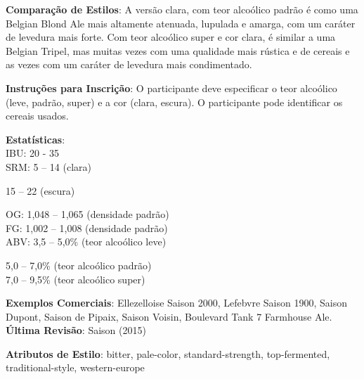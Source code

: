 \textbf{Comparação de Estilos}: A versão clara, com teor alcoólico padrão é como uma Belgian Blond Ale mais altamente atenuada, lupulada e amarga, com um caráter de levedura mais forte. Com teor alcoólico super e cor clara, é similar a uma Belgian Tripel, mas muitas vezes com uma qualidade mais rústica e de cereais e as vezes com um caráter de levedura mais condimentado.

\textbf{Instruções para Inscrição}: O participante deve especificar o teor alcoólico (leve, padrão, super) e a cor (clara, escura). O participante pode identificar os cereais usados.

\textbf{Estatísticas}:\\
IBU: 20 - 35\\
SRM: 5 – 14 (clara)
\begin{adjustwidth}{25pt}{0pt}
15 – 22 (escura)
\end{adjustwidth}
OG: 1,048 – 1,065 (densidade padrão)\\
FG: 1,002 – 1,008 (densidade padrão)\\
ABV: 3,5 – 5,0\% (teor alcoólico leve)
\begin{adjustwidth}{25pt}{0pt}
5,0 – 7,0\% (teor alcoólico padrão)\\
7,0 – 9,5\% (teor alcoólico super)
\end{adjustwidth}

\textbf{Exemplos Comerciais}: Ellezelloise Saison 2000, Lefebvre Saison 1900, Saison Dupont, Saison de Pipaix, Saison Voisin, Boulevard Tank 7 Farmhouse Ale. \\
\textbf{Última Revisão}: Saison (2015)

\textbf{Atributos de Estilo}: bitter, pale-color, standard-strength, top-fermented, traditional-style, western-europe
